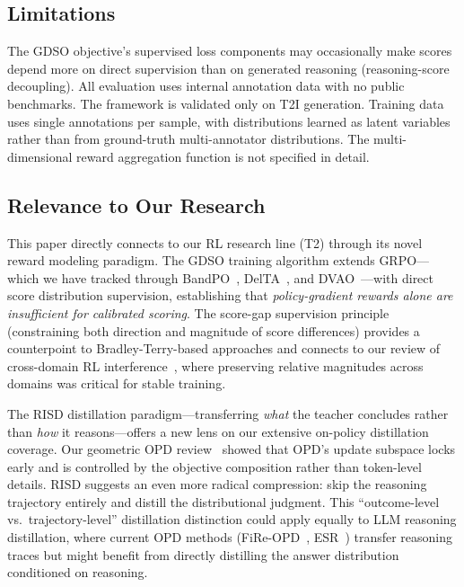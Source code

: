 \documentclass[11pt,a4paper]{article}
\begin{document}
\subsection{Limitations}

The GDSO objective's supervised loss components may occasionally make scores depend more on direct supervision than on generated reasoning (reasoning-score decoupling). All evaluation uses internal annotation data with no public benchmarks. The framework is validated only on T2I generation. Training data uses single annotations per sample, with distributions learned as latent variables rather than from ground-truth multi-annotator distributions. The multi-dimensional reward aggregation function is not specified in detail.

\subsection{Relevance to Our Research}

This paper directly connects to our RL research line (T2) through its novel reward modeling paradigm. The GDSO training algorithm extends GRPO---which we have tracked through BandPO~\cite{li2026bandpo}, DelTA~\cite{wang2026delta}, and DVAO~\cite{chen2026dvao}---with direct score distribution supervision, establishing that \emph{policy-gradient rewards alone are insufficient for calibrated scoring}. The score-gap supervision principle (constraining both direction and magnitude of score differences) provides a counterpoint to Bradley-Terry-based approaches and connects to our review of cross-domain RL interference~\cite{liu2026crossdomain}, where preserving relative magnitudes across domains was critical for stable training.

The RISD distillation paradigm---transferring \emph{what} the teacher concludes rather than \emph{how} it reasons---offers a new lens on our extensive on-policy distillation coverage. Our geometric OPD review~\cite{shen2026geometry} showed that OPD's update subspace locks early and is controlled by the objective composition rather than token-level details. RISD suggests an even more radical compression: skip the reasoning trajectory entirely and distill the distributional judgment. This ``outcome-level vs.\ trajectory-level'' distillation distinction could apply equally to LLM reasoning distillation, where current OPD methods (FiRe-OPD~\cite{li2026fireopd}, ESR~\cite{wang2026esr}) transfer reasoning traces but might benefit from directly distilling the answer distribution conditioned on reasoning.
\end{document}
